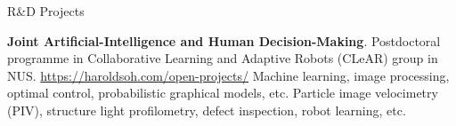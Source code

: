 \begin{rubric}{R&D Projects}


\entry*[]%
	\textbf{Joint Artificial-Intelligence and Human Decision-Making}. Postdoctoral programme in Collaborative Learning and Adaptive Robots (CLeAR) group in NUS. \url{https://haroldsoh.com/open-projects/}
%
\entry*[]%
	Machine learning, image processing, optimal control, probabilistic graphical models, etc.
%
\entry*[]%
	Particle image velocimetry (PIV), structure light profilometry, defect inspection, robot learning, etc.

\end{rubric}